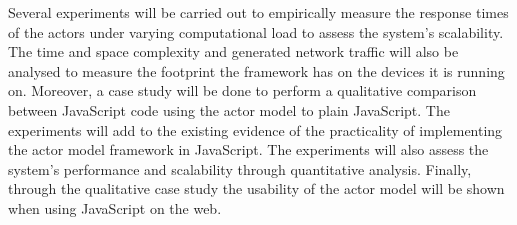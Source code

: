 \documentclass[12pt]{report}
\begin{document}
Several experiments will be carried out to empirically measure the response times of the actors under varying computational load to assess the system’s scalability. The time and space complexity and generated network traffic will also be analysed to measure the footprint the framework has on the devices it is running on. Moreover, a case study will be done to perform a qualitative comparison between JavaScript code using the actor model to plain JavaScript. The experiments will add to the existing evidence of the practicality of implementing the actor model framework in JavaScript. The experiments will also assess the system's performance and scalability through quantitative analysis. Finally, through the qualitative case study the usability of the actor model will be shown when using JavaScript on the web.


\end{document}
